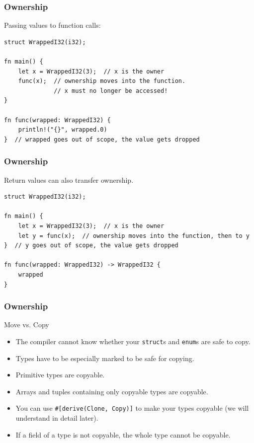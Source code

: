 \begin{frame}[fragile]
    \frametitle{Ownership}
    Passing values to function calls:
    \pause
    \vfill
    \begin{verbatim}
struct WrappedI32(i32);

fn main() {
    let x = WrappedI32(3);  // x is the owner
    func(x);  // ownership moves into the function.
              // x must no longer be accessed!
}

fn func(wrapped: WrappedI32) {
    println!("{}", wrapped.0)
}  // wrapped goes out of scope, the value gets dropped
    \end{verbatim}
\end{frame}

\begin{frame}[fragile]
    \frametitle{Ownership}
    Return values can also transfer ownership.
    \pause
    \vfill
    \begin{verbatim}
struct WrappedI32(i32);

fn main() {
    let x = WrappedI32(3);  // x is the owner
    let y = func(x);  // ownership moves into the function, then to y
}  // y goes out of scope, the value gets dropped

fn func(wrapped: WrappedI32) -> WrappedI32 {
    wrapped
}
    \end{verbatim}
\end{frame}

\begin{frame}[fragile]
    \frametitle{Ownership}
    Move vs. Copy
    \begin{itemize}
        \item The compiler cannot know whether your \texttt{struct}s and \texttt{enum}s are safe to copy.
        \item Types have to be especially marked to be safe for copying.
        \pause
        \vspace{.3cm}
        \item Primitive types are copyable.
        \item Arrays and tuples containing only copyable types are copyable.
        \pause
        \vspace{.3cm}
        \item You can use \texttt{\#[derive(Clone, Copy)]} to make your types copyable (we will understand in detail later).
        \item If a field of a type is not copyable, the whole type cannot be copyable. 
    \end{itemize}
\end{frame}


